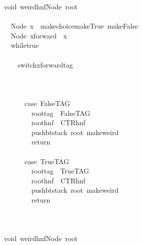 \documentclass{book}
\theoremstyle{definition}
\begin{document}
{\begin{tabbing}\ttfamily
~void~weirdhnfNode~root\\
\ttfamily ~\\
\ttfamily ~~~Node~x~~makechoicemakeTrue~makeFalse\\
\ttfamily ~~~Node~xforward~~x\\
\ttfamily ~~~whiletrue\\
\ttfamily ~~~\\
\ttfamily ~~~~~switchxforwardtag\\
\ttfamily ~~~~~\\
\ttfamily ~~~~~~~\\
\ttfamily ~\\
\ttfamily ~~~~~~~case~FalseTAG\\
\ttfamily ~~~~~~~~~roottag~~FalseTAG\\
\ttfamily ~~~~~~~~~roothnf~~CTRhnf\\
\ttfamily ~~~~~~~~~pushbtstack~root~makeweird\\
\ttfamily ~~~~~~~~~return\\
\ttfamily ~\\
\ttfamily ~~~~~~~case~TrueTAG\\
\ttfamily ~~~~~~~~~roottag~~TrueTAG\\
\ttfamily ~~~~~~~~~roothnf~~CTRhnf\\
\ttfamily ~~~~~~~~~pushbtstack~root~makeweird\\
\ttfamily ~~~~~~~~~return\\
\ttfamily ~~~~~\\
\ttfamily ~\\
\ttfamily ~\\
\ttfamily ~void~weirdhnfNode~root\\
\ttfamily ~\\

\end{tabbing}}
\end{document}
